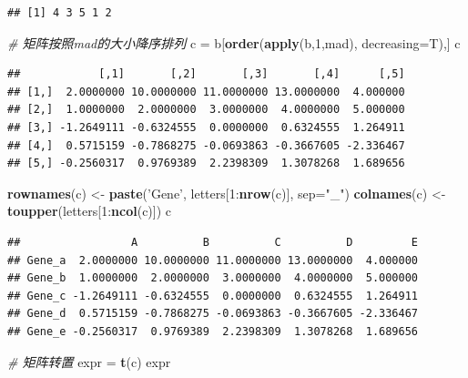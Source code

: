 \documentclass[]{article}
\newenvironment{Shaded}{\begin{snugshade}}{\end{snugshade}}
\newcommand{\KeywordTok}[1]{\textcolor[rgb]{0.13,0.29,0.53}{\textbf{{#1}}}}
\newcommand{\DataTypeTok}[1]{\textcolor[rgb]{0.13,0.29,0.53}{{#1}}}
\newcommand{\DecValTok}[1]{\textcolor[rgb]{0.00,0.00,0.81}{{#1}}}
\newcommand{\StringTok}[1]{\textcolor[rgb]{0.31,0.60,0.02}{{#1}}}
\newcommand{\CommentTok}[1]{\textcolor[rgb]{0.56,0.35,0.01}{\textit{{#1}}}}
\newcommand{\NormalTok}[1]{{#1}}
\numberwithin{figure}{section}
\numberwithin{table}{section}
\theoremstyle{definition}
\theoremstyle{definition}
\theoremstyle{definition}
\theoremstyle{remark}
\begin{document}
\begin{verbatim}
## [1] 4 3 5 1 2
\end{verbatim}

\begin{Shaded}
\begin{Highlighting}[]
\CommentTok{# 矩阵按照mad的大小降序排列}
\NormalTok{c =}\StringTok{ }\NormalTok{b[}\KeywordTok{order}\NormalTok{(}\KeywordTok{apply}\NormalTok{(b,}\DecValTok{1}\NormalTok{,mad), }\DataTypeTok{decreasing=}\NormalTok{T),]}
\NormalTok{c}
\end{Highlighting}
\end{Shaded}

\begin{verbatim}
##            [,1]       [,2]       [,3]       [,4]      [,5]
## [1,]  2.0000000 10.0000000 11.0000000 13.0000000  4.000000
## [2,]  1.0000000  2.0000000  3.0000000  4.0000000  5.000000
## [3,] -1.2649111 -0.6324555  0.0000000  0.6324555  1.264911
## [4,]  0.5715159 -0.7868275 -0.0693863 -0.3667605 -2.336467
## [5,] -0.2560317  0.9769389  2.2398309  1.3078268  1.689656
\end{verbatim}

\begin{Shaded}
\begin{Highlighting}[]
\KeywordTok{rownames}\NormalTok{(c) <-}\StringTok{ }\KeywordTok{paste}\NormalTok{(}\StringTok{'Gene'}\NormalTok{, letters[}\DecValTok{1}\NormalTok{:}\KeywordTok{nrow}\NormalTok{(c)], }\DataTypeTok{sep=}\StringTok{"_"}\NormalTok{)}
\KeywordTok{colnames}\NormalTok{(c) <-}\StringTok{ }\KeywordTok{toupper}\NormalTok{(letters[}\DecValTok{1}\NormalTok{:}\KeywordTok{ncol}\NormalTok{(c)])}
\NormalTok{c}
\end{Highlighting}
\end{Shaded}

\begin{verbatim}
##                 A          B          C          D         E
## Gene_a  2.0000000 10.0000000 11.0000000 13.0000000  4.000000
## Gene_b  1.0000000  2.0000000  3.0000000  4.0000000  5.000000
## Gene_c -1.2649111 -0.6324555  0.0000000  0.6324555  1.264911
## Gene_d  0.5715159 -0.7868275 -0.0693863 -0.3667605 -2.336467
## Gene_e -0.2560317  0.9769389  2.2398309  1.3078268  1.689656
\end{verbatim}

\begin{Shaded}
\begin{Highlighting}[]
\CommentTok{# 矩阵转置}
\NormalTok{expr =}\StringTok{ }\KeywordTok{t}\NormalTok{(c)}
\NormalTok{expr}
\end{Highlighting}
\end{Shaded}
\end{document}
